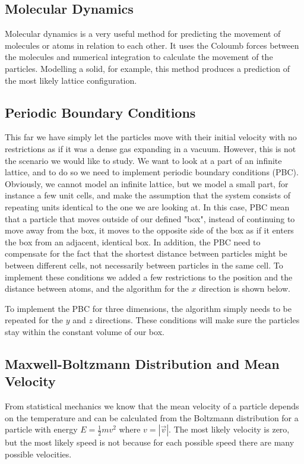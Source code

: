 \documentclass{article}
\begin{document}
\subsection{Molecular Dynamics}
Molecular dynamics is a very useful method for predicting the movement of molecules or atoms in relation to each other. It uses the Coloumb forces between the molecules and numerical integration to calculate the movement of the particles. Modelling a solid, for example, this method produces a prediction of the most likely lattice configuration.

\subsection{Periodic Boundary Conditions}
This far we have simply let the particles move with their initial velocity with no restrictions as if it was a dense gas expanding in a vacuum. However, this is not the scenario we would like to study. We want to look at a part of an infinite lattice, and to do so we need to implement periodic boundary conditions (PBC). Obviously, we cannot model an infinite lattice, but we model a small part, for instance a few unit cells, and make the assumption that the system consists of repeating units identical to the one we are looking at. In this case, PBC mean that a particle that moves outside of our defined "box", instead of continuing to move away from the box, it moves to the opposite side of the box as if it enters the box from an adjacent, identical box. In addition, the PBC need to compensate for the fact that the shortest distance between particles might be between different cells, not necessarily between particles in the same cell. To implement these conditions we added a few restrictions to the position and the distance between atoms, and the algorithm for the $x$ direction is shown below.

\begin{algorithm}[h]
\end{algorithm}
To implement the PBC for three dimensions, the algorithm simply needs to be repeated for the $y$ and $z$ directions. These conditions will make sure the particles stay within the constant volume of our box.


\subsection{Maxwell-Boltzmann Distribution and Mean Velocity}
From statistical mechanics we know that the mean velocity of a particle depends on the temperature and can be calculated from the Boltzmann distribution for a particle with energy $E=\frac{1}{2}mv^2$ where $v=|\vec{v}|$. The most likely velocity is zero, but the most likely speed is not because for each possible speed there are many possible velocities. 
\end{document}
